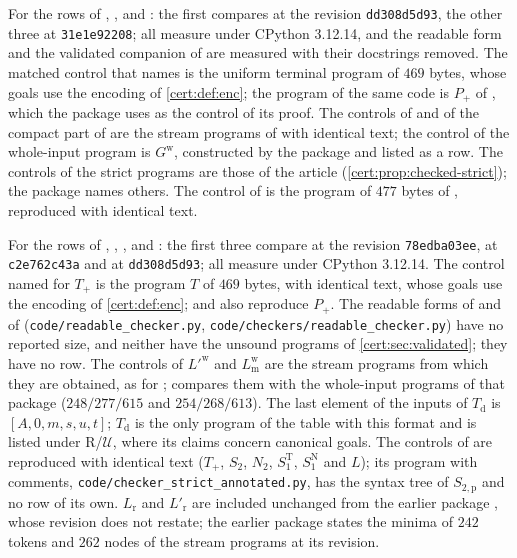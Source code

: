 For the rows of , , 
and : the first compares at the revision
\texttt{dd308d5d93}, the other three at \texttt{31e1e92208}; all measure under
CPython 3.12.14, and the readable form and the validated companion of
 are measured with their docstrings removed. The matched control that
 names is the uniform terminal program of $469$ bytes, whose
goals use the encoding of \cref{cert:def:enc}; the program of the same code is
$P_{+}$ of , which the package uses as the control of its proof.
The controls of  and of the compact part of 
are the stream programs of  with identical text; the control
of the whole-input program is $G^{\mathrm w}$, constructed by the package and
listed as a row. The controls of the strict programs are those of the article
(\cref{cert:prop:checked-strict}); the package names others. The control of
 is the program of $477$ bytes of
, reproduced with identical text.

For the rows of , ,
,  and :
the first three compare at the revision \texttt{78edba03ee}, 
at \texttt{c2e762c43a} and  at \texttt{dd308d5d93};
all measure under CPython 3.12.14. The control named for $T_{+}$ is the program
$T$ of $469$ bytes, with identical text, whose goals use the encoding of
\cref{cert:def:enc};  and  also
reproduce $P_{+}$. The readable forms of  and of
 (\texttt{code/readable\_checker.py},
\texttt{code/checkers/readable\_checker.py}) have no reported size, and neither
have the unsound programs of \cref{cert:sec:validated}; they have no row. The
controls of $L'^{\mathrm w}$ and $L^{\mathrm w}_{\mathrm m}$ are the stream
programs from which they are obtained, as for ;
 compares them with the whole-input programs of that package
($248/277/615$ and $254/268/613$). The last element of the inputs of
$T_{\mathrm d}$ is $[A,0,m,s,u,t]$; $T_{\mathrm d}$ is the only program of the
table with this format and is listed under R/$\mathcal U$, where its claims
concern canonical goals. The controls of  are
reproduced with identical text ($T_{+}$, $S_2$, $N_2$, $S^{\mathrm T}_1$,
$S^{\mathrm N}_1$ and $L$); its program with comments,
\texttt{code/checker\_strict\_annotated.py}, has the syntax tree of
$S_{2,\mathrm p}$ and no row of its own. $L_{\mathrm r}$ and $L'_{\mathrm r}$ are
included unchanged from the earlier package , whose
revision  does not restate; the earlier package
states the minima of $242$ tokens and $262$ nodes of the stream programs at its
revision.

